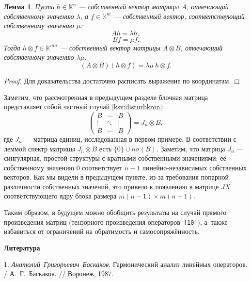 \documentclass[12pt]{article}
\newtheorem{ksvlem}[ksvthm]{Лемма}
\theoremstyle{definition}
\begin{document}
\begin{ksvlem}
    Пусть \( h\in\mathbb{K}^n \) --- собственный вектор матрицы \( A \),
    отвечающий собственному значению \( \lambda \),
    а \( f\in\mathbb{K}^m \) --- собственный вектор,
    соответствующий собственному значению \( \mu \):
    \[
        A h = \lambda h,
        \]
    \[
        B f = \mu f.
        \]
    Тогда \( h\otimes f \in \mathbb{K}^{mn} \)
    --- собственный вектор матрицы \( A\otimes B \),
    отвечающий собственному значению \( \lambda\mu \):
    \[
        (A\otimes B)(h\otimes f) = \lambda\mu\ h\otimes f.
        \]
\end{ksvlem}
\begin{proof}
    Для доказательства достаточно расписать выражение по координатам.
\end{proof}

Заметим, что рассмотренная в предыдущем разделе
    блочная матрица
    представляет собой частный случай \eqref{ksv:disturbkron}:
\[
    \begin{pmatrix}
        B      & \cdots & B \\
        \vdots & \ddots & \vdots \\
        B      & \cdots & B
    \end{pmatrix} =
    J_n \otimes B,
        \]
    где \( J_n \) --- матрица единиц,
    исследованная в первом примере.
В соответствии с леммой спектр
    матрицы \( J_n \otimes B \)
    есть \( \{ 0 \} \cup n\sigma(B) \).
Заметим, что матрица \( J_n \)
    --- сингулярная, простой структуры с кратными собственными значениями:
    её собственному значению \( 0 \)
    соответствует \( n{-}1 \) линейно-независимых
    собственных векторов.
Как мы видели в предыдущем пункте,
    из-за требования попарной различности собственных значений,
    это привело к появлению  в матрице \( J X \) соответствующего ядру
    блока размера \( m(n{-}1)\times m(n{-}1) \).

Таким образом, в будущем можно обобщить результаты
    на случай прямого произведения матриц
    (тензорного произведения операторов~\texttt{[10]}),
    а~также избавиться от ограничений на обратимость и самосопряжённость.

\smallskip\centerline{\bf Литература}


1. 
\emph{Анатолий~Григорьевич~Баскаков}.
Гармонический анализ линейных операторов.
/ А.~Г.~Баскаков.
// Воронеж, 1987.
\end{document}
